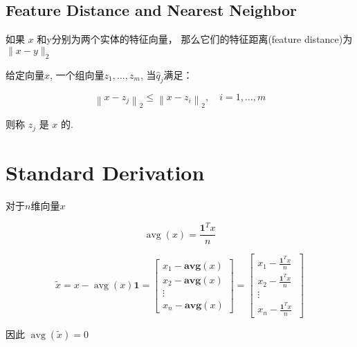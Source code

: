 \subsection{Feature Distance and Nearest Neighbor}

\begin{definition}
    如果 $ x $ 和y分别为两个实体的特征向量， 那么它们的特征距离(feature distance)为 $ \|x-y\|_{2} $
\end{definition}



\begin{definition}
    给定向量$x$, 一个组向量$ z_{1}, \ldots, z_{m} $, 当$ \hat{q}_{j} $满足：

    \begin{equation} \left\|x-z_{j}\right\|_{2} \leq\left\|x-z_{i}\right\|_{2}, \quad i=1, \ldots, m \end{equation}

    则称 $ z_{j} $ 是 $ x $ 的.
\end{definition}

\section{Standard Derivation}

\begin{definition}[算术平均值]
    对于$n$维向量$x$

    \begin{equation} \operatorname{avg}(x)=\frac{\mathbf{1}^{T} x}{n} \end{equation}
\end{definition}

\begin{definition}
    \begin{equation} \tilde{x}=x-\operatorname{avg}(x) \mathbf{1}\displaystyle =\left[\begin{array}{ c }
        x_{1} -\mathbf{avg} (x)\\
        x_{2} -\mathbf{avg} (x)\\
        \vdots \\
        x_{n} -\mathbf{avg} (x)
        \end{array}\right] =\left[\begin{array}{ c }
        x_{1} -\frac{\mathbf{1}^{T} x}{n} \ \\
        x_{2} -\frac{\mathbf{1}^{T} x}{n} \ \\
        \vdots \\
        x_{n} -\frac{\mathbf{1}^{T} x}{n} \ 
        \end{array}\right]\end{equation}

    因此 $ \operatorname{avg} (\tilde{x})=0 $
\end{definition}

